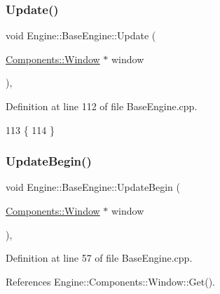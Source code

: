 \subsubsection{\texorpdfstring{Update()}{Update()}\hspace{0.1cm}{\footnotesize\ttfamily [2/2]}}
{\footnotesize\ttfamily void Engine\+::\+Base\+Engine\+::\+Update (\begin{DoxyParamCaption}\item[{\mbox{\hyperlink{classEngine_1_1Components_1_1Window}{Components\+::\+Window}} $\ast$}]{window }\end{DoxyParamCaption})\hspace{0.3cm}{\ttfamily [virtual]}, {\ttfamily [inherited]}}



Definition at line 112 of file Base\+Engine.\+cpp.


\begin{DoxyCode}
113 \{
114 \}
\end{DoxyCode}
\mbox{\label{classEngine_1_1BaseEngine_aace6be2a42d12b64fbd35f1acdb08408}} 
\subsubsection{\texorpdfstring{Update\+Begin()}{UpdateBegin()}}
{\footnotesize\ttfamily void Engine\+::\+Base\+Engine\+::\+Update\+Begin (\begin{DoxyParamCaption}\item[{\mbox{\hyperlink{classEngine_1_1Components_1_1Window}{Components\+::\+Window}} $\ast$}]{window }\end{DoxyParamCaption})\hspace{0.3cm}{\ttfamily [virtual]}, {\ttfamily [inherited]}}



Definition at line 57 of file Base\+Engine.\+cpp.



References Engine\+::\+Components\+::\+Window\+::\+Get().



